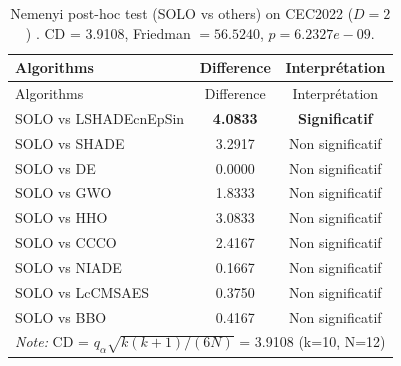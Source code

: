 \begin{center}
\small
\renewcommand{\arraystretch}{1.25}
\begin{longtable}{lcc}
\caption{Nemenyi post-hoc test (SOLO vs others) on CEC2022 ($D=2$) . CD = 3.9108, Friedman $=56.5240$, $p=6.2327e-09$.}
\label{tab:nemenyi_CEC2022_2} \\
\toprule
Algorithms & Difference & Interprétation \\
\midrule
\endfirsthead
\toprule
Algorithms & Difference & Interprétation \\
\midrule
\endhead
SOLO vs LSHADEcnEpSin & \textbf{4.0833} & \textbf{Significatif} \\
SOLO vs SHADE & 3.2917 & Non significatif \\
SOLO vs DE & 0.0000 & Non significatif \\
SOLO vs GWO & 1.8333 & Non significatif \\
SOLO vs HHO & 3.0833 & Non significatif \\
SOLO vs CCCO & 2.4167 & Non significatif \\
SOLO vs NIADE & 0.1667 & Non significatif \\
SOLO vs LcCMSAES & 0.3750 & Non significatif \\
SOLO vs BBO & 0.4167 & Non significatif \\
\midrule
\multicolumn{3}{l}{\textit*{Note:} CD = $q_\alpha \sqrt{k(k+1)/(6N)}$ = 3.9108 (k=10, N=12)} \\
\bottomrule
\end{longtable}
\end{center}